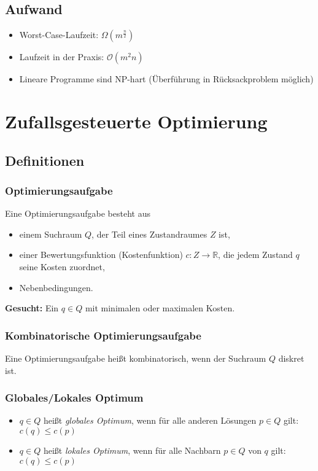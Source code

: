 \subsection{Aufwand}
\begin{itemize}
	\item Worst-Case-Laufzeit: \(\Omega(m^{\frac{n}{2}})\)
	\item Laufzeit in der Praxis: \(\mathcal{O}(m^2n)\)
	\item Lineare Programme sind NP-hart (Überführung in Rücksackproblem möglich)
\end{itemize}



\section{Zufallsgesteuerte Optimierung}

\subsection{Definitionen}

\subsubsection{Optimierungsaufgabe}
Eine Optimierungsaufgabe besteht aus
\begin{itemize}
	\item einem Suchraum \(Q\), der Teil eines Zustandraumes \(Z\) ist,
	\item einer Bewertungsfunktion (Kostenfunktion) \(c:Z \rightarrow \mathbb{R}\), die jedem Zustand \(q\) seine Kosten zuordnet,
	\item Nebenbedingungen.
\end{itemize}
\textbf{Gesucht:} Ein \(q \in Q\) mit minimalen oder maximalen Kosten.

\subsubsection{Kombinatorische Optimierungsaufgabe}
Eine Optimierungsaufgabe heißt kombinatorisch, wenn der Suchraum \(Q\) diskret ist.

\subsubsection{Globales/Lokales Optimum}
\begin{itemize}
	\item \(q \in Q\) heißt \textit{globales Optimum}, wenn für alle anderen Lösungen \(p \in Q\) gilt: \(c(q) \leq c(p)\)
	\item \(q \in Q\) heißt \textit{lokales Optimum}, wenn für alle Nachbarn \(p \in Q\) von \(q\) gilt: \(c(q) \leq c(p)\)
\end{itemize}


